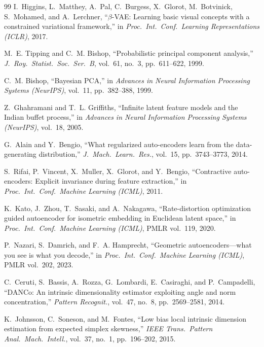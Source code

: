 \documentclass[11pt,a4paper]{jsarticle}
\begin{document}
\begin{thebibliography}{99}
I.~Higgins, L.~Matthey, A.~Pal, C.~Burgess, X.~Glorot, M.~Botvinick,
S.~Mohamed, and A.~Lerchner,
``$\beta$-VAE: Learning basic visual concepts with a constrained variational
framework,''
in \textit{Proc.\ Int.\ Conf.\ Learning Representations (ICLR)}, 2017.

M.~E. Tipping and C.~M. Bishop,
``Probabilistic principal component analysis,''
\textit{J.\ Roy.\ Statist.\ Soc.\ Ser.\ B}, vol.~61, no.~3, pp.~611--622,
1999.

C.~M. Bishop,
``Bayesian PCA,''
in \textit{Advances in Neural Information Processing Systems (NeurIPS)},
vol.~11, pp.~382--388, 1999.

Z.~Ghahramani and T.~L. Griffiths,
``Infinite latent feature models and the Indian buffet process,''
in \textit{Advances in Neural Information Processing Systems (NeurIPS)},
vol.~18, 2005.

G.~Alain and Y.~Bengio,
``What regularized auto-encoders learn from the data-generating
distribution,''
\textit{J.\ Mach.\ Learn.\ Res.}, vol.~15, pp.~3743--3773, 2014.

S.~Rifai, P.~Vincent, X.~Muller, X.~Glorot, and Y.~Bengio,
``Contractive auto-encoders: Explicit invariance during feature extraction,''
in \textit{Proc.\ Int.\ Conf.\ Machine Learning (ICML)}, 2011.

K.~Kato, J.~Zhou, T.~Sasaki, and A.~Nakagawa,
``Rate-distortion optimization guided autoencoder for isometric embedding in
Euclidean latent space,''
in \textit{Proc.\ Int.\ Conf.\ Machine Learning (ICML)}, PMLR vol.~119, 2020.

P.~Nazari, S.~Damrich, and F.~A. Hamprecht,
``Geometric autoencoders---what you see is what you decode,''
in \textit{Proc.\ Int.\ Conf.\ Machine Learning (ICML)}, PMLR vol.~202, 2023.

C.~Ceruti, S.~Bassis, A.~Rozza, G.~Lombardi, E.~Casiraghi, and
P.~Campadelli,
``DANCo: An intrinsic dimensionality estimator exploiting angle and norm
concentration,''
\textit{Pattern Recognit.}, vol.~47, no.~8, pp.~2569--2581, 2014.

K.~Johnsson, C.~Soneson, and M.~Fontes,
``Low bias local intrinsic dimension estimation from expected simplex
skewness,''
\textit{IEEE Trans.\ Pattern Anal.\ Mach.\ Intell.}, vol.~37, no.~1,
pp.~196--202, 2015.


\end{thebibliography}
\end{document}
